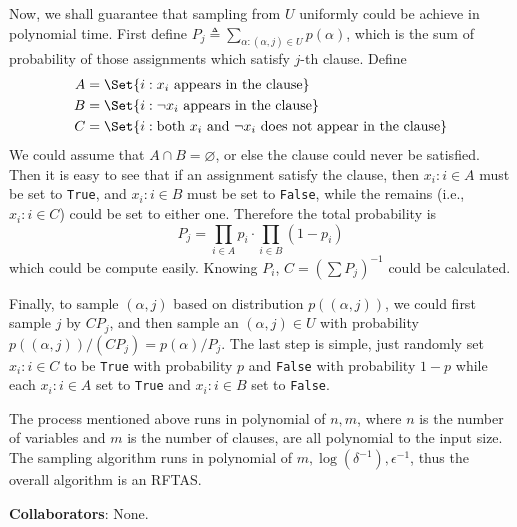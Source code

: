 \documentclass[12pt, a4paper]{article}
\newcommand{\defeq}{\triangleq}
\begin{document}
Now, we shall guarantee that sampling from $U$ uniformly could be achieve in polynomial time.
First define $P_j \defeq \sum_{\alpha: (\alpha, j) \in U} p(\alpha)$, which is the sum
of probability of those assignments which satisfy $j$-th clause. Define
\begin{align*}
  A &= \Set{ i: x_i \text{ appears in the clause}} \\
  B &= \Set{ i: \lnot x_i \text{ appears in the clause}} \\
  C &= \Set{ i: \text{both } x_i \text{ and } \lnot x_i \text{ does not appear in the clause}}
\end{align*}
We could assume that $A \cap B = \varnothing$, or else the clause could never be satisfied.
Then it is easy to see that if an assignment satisfy the clause,
then $x_i : i \in A$ must be set to \texttt{True}, and $x_i : i \in B$ must be
set to \texttt{False}, while the remains (i.e., $x_i : i \in C$) could
be set to either one. Therefore the total probability is
\[ P_j = \prod_{i \in A} p_i \cdot \prod_{i \in B} (1 - p_i) \]
which could be compute easily. Knowing $P_i$, $C = (\sum P_j)^{-1}$ could be calculated.

Finally, to sample $(\alpha, j)$ based on distribution $p((\alpha, j))$, we could
first sample $j$ by $C P_j$, and then sample an $(\alpha, j) \in U$ with probability
$p((\alpha, j)) / (C P_j) = p(\alpha) / P_j$. The last step is simple,
just randomly set $x_i : i \in C$ to be \texttt{True} with probability $p$
and \texttt{False} with probability $1-p$ while each $x_i : i \in A$
set to \texttt{True} and $x_i : i \in B$ set to \texttt{False}.

The process mentioned above runs in polynomial of $n, m$, where $n$ is
the number of variables and $m$ is the number of clauses, are all
polynomial to the input size. The sampling algorithm
runs in polynomial of $m, \log(\delta^{-1}), \epsilon^{-1}$,
thus the overall algorithm is an RFTAS.

{\bf Collaborators}: None.
\end{document}
